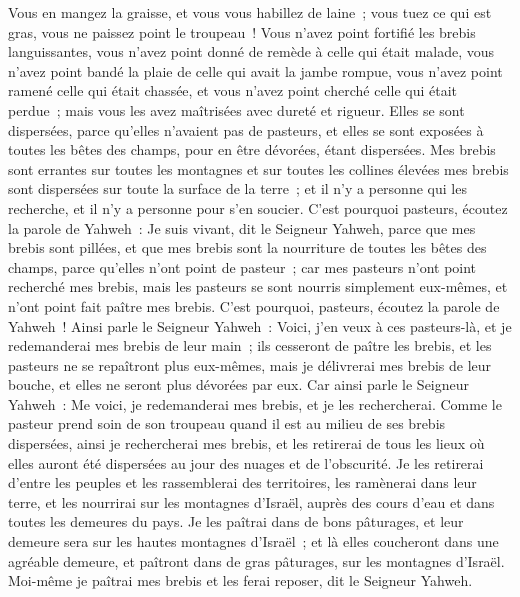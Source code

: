 \begin{multicols}{2}
Vous en mangez la graisse, et vous vous habillez de laine~; vous tuez ce qui est gras, vous ne paissez point le troupeau~!
Vous n'avez point fortifié les brebis languissantes, vous n'avez point donné de remède à celle qui était malade, vous n'avez point bandé la plaie de celle qui avait la jambe rompue, vous n'avez point ramené celle qui était chassée, et vous n'avez point cherché celle qui était perdue~; mais vous les avez maîtrisées avec dureté et rigueur.
Elles se sont dispersées, parce qu'elles n'avaient pas de pasteurs, et elles se sont exposées à toutes les bêtes des champs, pour en être dévorées, étant dispersées.
Mes brebis sont errantes sur toutes les montagnes et sur toutes les collines élevées mes brebis sont dispersées sur toute la surface de la terre~; et il n'y a personne qui les recherche, et il n'y a personne pour s'en soucier.
C'est pourquoi pasteurs, écoutez la parole de Yahweh~:
Je suis vivant, dit le Seigneur Yahweh, parce que mes brebis sont pillées, et que mes brebis sont la nourriture de toutes les bêtes des champs, parce qu'elles n'ont point de pasteur~; car mes pasteurs n'ont point recherché mes brebis, mais les pasteurs se sont nourris simplement eux-mêmes, et n'ont point fait paître mes brebis.
C'est pourquoi, pasteurs, écoutez la parole de Yahweh~!
Ainsi parle le Seigneur Yahweh~: Voici, j'en veux à ces pasteurs-là, et je redemanderai mes brebis de leur main~; ils cesseront de paître les brebis, et les pasteurs ne se repaîtront plus eux-mêmes, mais je délivrerai mes brebis de leur bouche, et elles ne seront plus dévorées par eux.
Car ainsi parle le Seigneur Yahweh~: Me voici, je redemanderai mes brebis, et je les rechercherai.
Comme le pasteur prend soin de son troupeau quand il est au milieu de ses brebis dispersées, ainsi je rechercherai mes brebis, et les retirerai de tous les lieux où elles auront été dispersées au jour des nuages et de l'obscurité.
Je les retirerai d'entre les peuples et les rassemblerai des territoires, les ramènerai dans leur terre, et les nourrirai sur les montagnes d'Israël, auprès des cours d'eau et dans toutes les demeures du pays.
Je les paîtrai dans de bons pâturages, et leur demeure sera sur les hautes montagnes d'Israël~; et là elles coucheront dans une agréable demeure, et paîtront dans de gras pâturages, sur les montagnes d'Israël.
Moi-même je paîtrai mes brebis et les ferai reposer, dit le Seigneur Yahweh.

\end{multicols}
